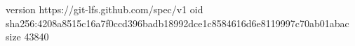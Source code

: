 version https://git-lfs.github.com/spec/v1
oid sha256:4208a8515c16a7f0ccd396badb18992dce1c8584616d6e8119997c70ab01abac
size 43840
